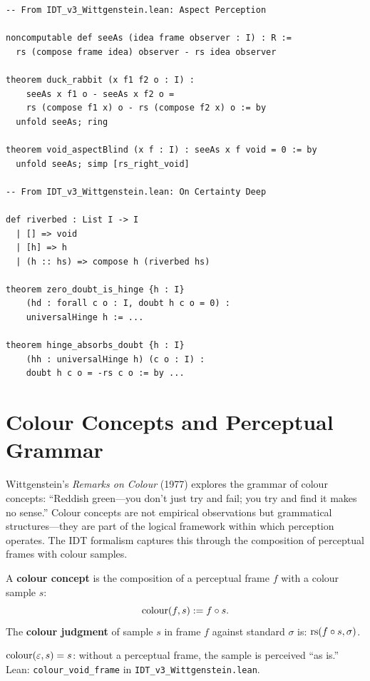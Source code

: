 \begin{lstlisting}
-- From IDT_v3_Wittgenstein.lean: Aspect Perception

noncomputable def seeAs (idea frame observer : I) : R :=
  rs (compose frame idea) observer - rs idea observer

theorem duck_rabbit (x f1 f2 o : I) :
    seeAs x f1 o - seeAs x f2 o =
    rs (compose f1 x) o - rs (compose f2 x) o := by
  unfold seeAs; ring

theorem void_aspectBlind (x f : I) : seeAs x f void = 0 := by
  unfold seeAs; simp [rs_right_void]

-- From IDT_v3_Wittgenstein.lean: On Certainty Deep

def riverbed : List I -> I
  | [] => void
  | [h] => h
  | (h :: hs) => compose h (riverbed hs)

theorem zero_doubt_is_hinge {h : I}
    (hd : forall c o : I, doubt h c o = 0) :
    universalHinge h := ...

theorem hinge_absorbs_doubt {h : I}
    (hh : universalHinge h) (c o : I) :
    doubt h c o = -rs c o := by ...
\end{lstlisting}

\section{Colour Concepts and Perceptual Grammar}

Wittgenstein's \textit{Remarks on Colour} (1977) explores the grammar of
colour concepts: ``Reddish green---you don't just try and fail; you try and find
it makes no sense.'' Colour concepts are not empirical observations but
grammatical structures---they are part of the logical framework within which
perception operates. The IDT formalism captures this through the composition
of perceptual frames with colour samples.

\begin{definition}
\label{def:colour-concept}
A \textbf{colour concept} is the composition of a perceptual frame $f$ with a
colour sample $s$:
\[
\mathrm{colour}(f, s) := f \circ s.
\]
The \textbf{colour judgment} of sample $s$ in frame $f$ against standard $\sigma$ is:
$\mathrm{rs}(f \circ s, \sigma)$.
\end{definition}

\begin{theorem}
\label{thm:colour-void-frame}
$\mathrm{colour}(\varepsilon, s) = s$: without a perceptual frame, the sample is
perceived ``as is.''
Lean: \texttt{colour\_void\_frame} in \texttt{IDT\_v3\_Wittgenstein.lean}.
\end{theorem}

